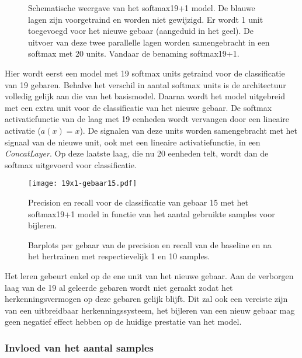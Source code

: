 \begin{figure}
	\centering
	\def\svgwidth{0.7\columnwidth}
	
	\caption{Schematische weergave van het softmax19+1 model. De blauwe lagen zijn voorgetraind en worden niet gewijzigd. Er wordt 1 unit toegevoegd voor het nieuwe gebaar (aangeduid in het geel). De uitvoer van deze twee parallelle lagen worden samengebracht in een softmax met 20 units. Vandaar de benaming softmax19+1. }\label{fig:19x1-all}
\end{figure}

\npar Hier wordt eerst een model met 19 softmax units getraind voor de classificatie van 19 gebaren. Behalve het verschil in aantal softmax units is de architectuur volledig gelijk aan die van het basismodel. Daarna wordt het model uitgebreid met een extra unit voor de classificatie van het nieuwe gebaar. De softmax activatiefunctie van de laag met 19 eenheden wordt vervangen door een lineaire activatie ($a(x)=x$). De signalen van deze units worden samengebracht met het signaal van de nieuwe unit, ook met een lineaire activatiefunctie, in een \textit{ConcatLayer}.  Op deze laatste laag, die nu 20 eenheden telt, wordt dan de softmax uitgevoerd voor classificatie.

\begin{figure}
	\centering
	\texttt{[image: 19x1-gebaar15.pdf]}
	\caption{Precision en recall voor de classificatie van gebaar 15 met het softmax19+1 model in functie van het aantal gebruikte samples voor bijleren.}\label{fig:19x1-gebaar15}
	
		\vspace{0.5cm}
		\def\svgwidth{1.1\columnwidth}
		
		\caption{Barplots per gebaar van de precision en recall van de baseline en na het hertrainen met respectievelijk 1 en 10 samples. }\label{fig:19x1-all}
\end{figure}

\npar Het leren gebeurt enkel op de ene unit van het nieuwe gebaar. Aan de verborgen laag van de 19 al geleerde gebaren wordt niet geraakt zodat het herkenningsvermogen op deze gebaren gelijk blijft. Dit zal ook een vereiste zijn van een uitbreidbaar herkenningssysteem, het bijleren van een nieuw gebaar mag geen negatief effect hebben op de huidige prestatie van het model.

\subsubsection{Invloed van het aantal samples}

